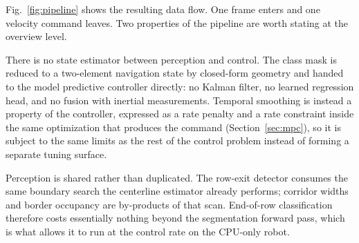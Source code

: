 \documentclass[conference]{IEEEtran}
\begin{document}
Fig.~\ref{fig:pipeline} shows the resulting data flow. One frame enters and one
velocity command leaves. Two properties of the pipeline are worth stating at the
overview level.

There is no state estimator between perception and control. The class mask is
reduced to a two-element navigation state by closed-form geometry and handed to
the model predictive controller directly: no Kalman filter, no learned
regression head, and no fusion with inertial measurements. Temporal smoothing is
instead a property of the controller, expressed as a rate penalty and a rate
constraint inside the same optimization that produces the command
(Section~\ref{sec:mpc}), so it is subject to the same limits as the rest of the
control problem instead of forming a separate tuning surface.

Perception is shared rather than duplicated. The row-exit detector consumes the
same boundary search the centerline estimator already performs; corridor widths
and border occupancy are by-products of that scan. End-of-row classification
therefore costs essentially nothing beyond the segmentation forward pass, which
is what allows it to run at the control rate on the CPU-only robot.
\end{document}
